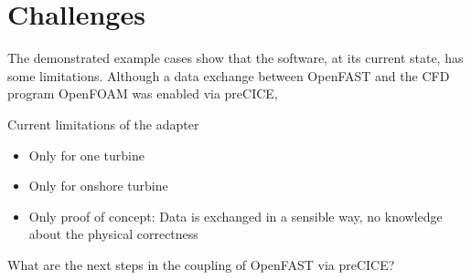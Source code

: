 \section{Challenges}
\label{section:challenges}

The demonstrated example cases show that the software, at its current state, has some limitations. Although a data exchange between OpenFAST and the CFD program OpenFOAM was enabled via preCICE, 

Current limitations of the adapter
\begin{itemize}
	\item Only for one turbine
	\item Only for onshore turbine
	\item Only proof of concept: Data is exchanged in a sensible way, no knowledge about the physical correctness\\
\end{itemize}

What are the next steps in the coupling of OpenFAST via preCICE?\\

